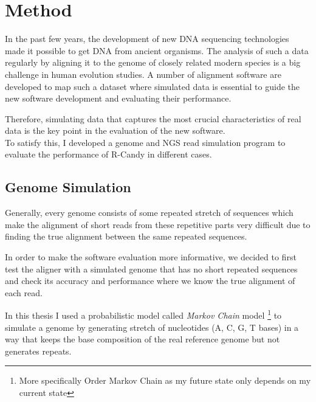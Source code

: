\documentclass[11pt,a4paper]{report}
\begin{document}


\section{Method} \label{Method}

In the past few years, the development of new DNA sequencing technologies made 
it possible to get DNA from ancient organisms.
The analysis of such a data regularly by aligning it to the genome of closely 
related modern species is a big challenge in human evolution studies.
A number of alignment software are developed to map such a dataset where 
simulated data is essential to guide the new software development and 
evaluating their performance.

Therefore, simulating data that captures the most crucial characteristics 
of real data is the key point in the evaluation of the new software.\\

To satisfy this, I developed a genome and NGS read simulation program to evaluate 
the performance of R-Candy in different cases.



\subsection{Genome Simulation} 
\label{ Genome Simulation }

Generally, every genome consists of some repeated stretch of sequences which make 
the alignment of short reads from these repetitive parts very difficult due to 
finding the true alignment between the same repeated sequences.

In order to make the software evaluation more informative, we decided to first 
test the aligner with a simulated genome that has no short repeated sequences 
and check its accuracy and performance where we know the true alignment of each 
read.

In this thesis I used a probabilistic model called \emph{Markov Chain} model 
\footnote{More specifically  Order Markov Chain as my future state only 
depends on my current state} to simulate a genome by generating stretch of 
nucleotides (A, C, G, T bases) in a way that  keeps the base composition of the 
real reference genome but not generates repeats.
 
\end{document}
